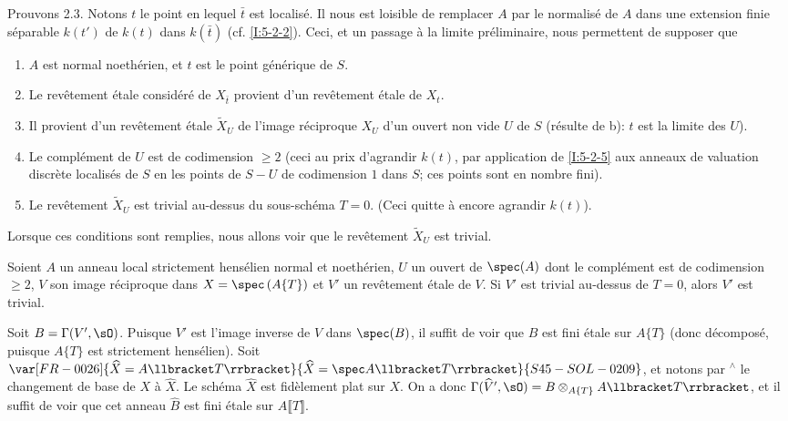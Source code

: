 \begingroup
\renewcommand*{\thesubsubsection}{2.3.3}
\begin{sourcebareinline}\label{I:5-2-6} %
Prouvons 2.3. Notons $t$ le point en lequel $\bar t$ est localisé. Il nous est loisible de 
remplacer $A$ par le normalisé de $A$ dans une extension finie séparable 
$k(t')$ de $k(t)$ dans $k(\bar t)$ (cf. \ref{I:5-2-2}). Ceci, et un passage à 
la limite préliminaire, nous permettent de supposer que 
\begin{enumerate}[\indent a)]
  \item $A$ est normal noethérien, et $t$ est le point générique de $S$.
  \item Le revêtement étale considéré de $X_{\bar t}$ provient d'un 
    revêtement étale de $X_t$. 
  \item Il provient d'un revêtement étale $\widetilde X_U$ de l'image 
    réciproque $X_U$ d'un ouvert non vide $U$ de $S$ (résulte de b): $t$ 
    est la limite des $U$).
  \item Le complément de $U$ est de codimension $\geqslant 2$ (ceci au prix 
    d'agrandir $k(t)$, par application de \ref{I:5-2-5} aux anneaux de 
    valuation discrète localisés de $S$ en les points de $S-U$ de 
    codimension $1$ dans $S$; ces points sont en nombre fini). 
  \item Le revêtement $\widetilde X_U$ est trivial au-dessus du sous-schéma 
    $T=0$. (Ceci quitte à encore agrandir $k(t)$). 
\end{enumerate}
\end{sourcebareinline}
\endgroup

Lorsque ces conditions sont remplies, nous allons voir que le revêtement 
$\widetilde X_U$ est trivial. 





\begingroup
\renewcommand*{\thesubsubsection}{2.3.4}
\begin{lemmadotdash}\label{I:5-2-7} %
Soient $A$ un anneau local strictement hensélien normal et noethérien, $U$ 
un ouvert de $\spec(A)$ dont le complément est de codimension $\geqslant 2$, 
$V$ son image réciproque dans $X=\spec\left(A\{T\}\right)$ et $V'$ un 
revêtement étale de $V$. Si $V'$ est trivial au-dessus de $T=0$, alors $V'$ 
est trivial. 
\end{lemmadotdash}
\endgroup

Soit $B=\Gamma(V',\sO)$. Puisque $V'$ est l'image inverse de $V$ dans 
$\spec(B)$, il suffit de voir que $B$ est fini étale sur $A\{T\}$ (donc 
décomposé, puisque $A\{T\}$ est strictement hensélien). Soit 
$\var[FR-0026]{\widehat X=A\llbracket T\rrbracket}{\widehat X=\spec A\llbracket T\rrbracket}{S45-SOL-0209}$, et notons par ${}^\wedge$ le changement 
de base de $X$ à $\widehat X$. Le schéma $\widehat X$ est fidèlement plat 
sur $X$. On a donc 
$\Gamma(\widehat V',\sO) = B\otimes_{A\{T\}} A\llbracket T\rrbracket$, et il 
suffit de voir que cet anneau $\widehat B$ est fini étale sur 
$A\llbracket T\rrbracket$. 

